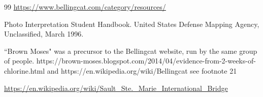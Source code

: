 \documentclass[12pt]{iopart}
\begin{document}
\begin{thebibliography}{99}
\href{https://www.bellingcat.com/category/resources/}{https://www.bellingcat.com/category/resources/}

Photo Interpretation Student Handbook.
United States Defense Mapping Agency,
Unclassified,
March 1996.

``Brown Moses" was a precursor to the Bellingcat website, run by the same group of people.
https://brown-moses.blogspot.com/2014/04/evidence-from-2-weeks-of-chlorine.html 
and 
https://en.wikipedia.org/wiki/Bellingcat see footnote 21

\href{https://en.wikipedia.org/wiki/Sault_Ste._Marie_International_Bridge}{https://en.wikipedia.org/wiki/Sault\_Ste.\_Marie\_International\_Bridge}

\end{thebibliography}
\end{document}
